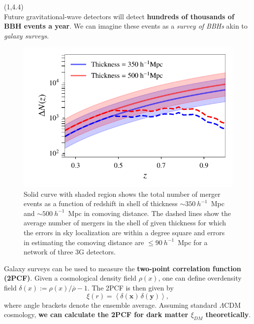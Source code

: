 \documentclass[a1,portrait]{a1poster}
\newcommand{\headingcolor}{\color{BannerElevenColor}}
\newcommand{\x}{\mathbf{x}}
\newcommand{\y}{\mathbf{y}}
\def\LHead#1{\noindent{\LARGE \headingcolor #1}\smallskip}
\begin{document}
\begin{textblock}{7}(1,4.4)	%
\LHead{Introduction}\\
Future gravitational-wave detectors will detect \textbf{hundreds of thousands of BBH events a year}. We can imagine these events as a \textit{survey of BBHs} akin to \textit{galaxy surveys}.

\begin{figure}
	\centering
	\includegraphics[scale=1.6]{Nz_vs_z.pdf}
	\caption{\small{Solid curve with shaded region shows the total number of merger events as a function of redshift in shell of thickness $\sim 350~h^{-1}$~Mpc and $\sim 500~h^{-1}$~Mpc in comoving distance. The dashed lines show the average number of mergers in the shell of given thickness for which the errors in sky localization are within a degree square and errors in estimating the comoving distance are $\le 90~h^{-1}$~Mpc for a network of three 3G detectors.}} 
	\label{fig:mergers_events}
\end{figure}
Galaxy surveys can be used to measure the \textbf{two-point correlation function (2PCF)}. Given a cosmological density field $ \rho(x) $, one can define overdensity field $\delta(x) := \rho(x) / \overline{\rho} - 1$.
The 2PCF is  then given by
\begin{equation}
\xi({r}) = \left<\delta(\x) \, \delta(\y)\right> \label{corrfunc},
\end{equation}
where angle brackets denote the ensemble average. Assuming standard $ \Lambda $CDM cosmology, \textbf{we can calculate the 2PCF for dark matter $ \xi_{DM} $ theoretically}.\\


\end{textblock}
\end{document}
